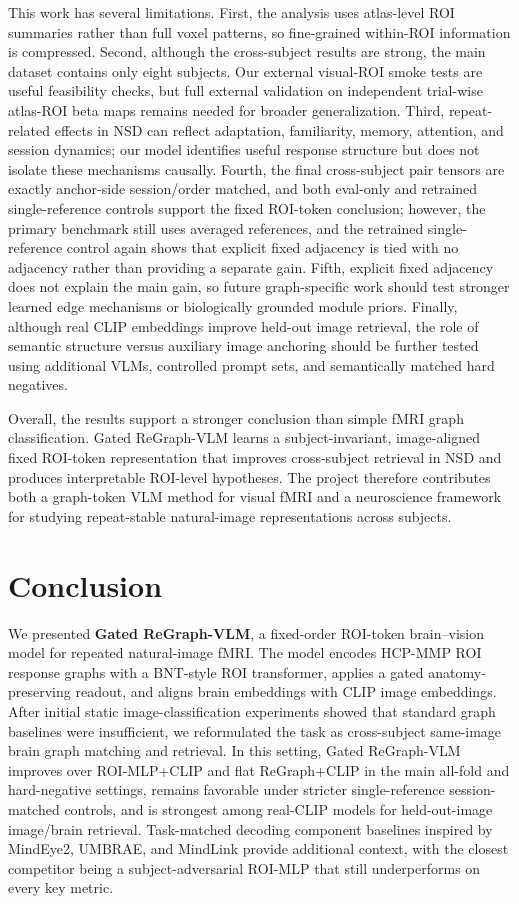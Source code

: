 \documentclass{article}
\begin{document}
This work has several limitations. First, the analysis uses atlas-level ROI summaries rather than full voxel patterns, so fine-grained within-ROI information is compressed. Second, although the cross-subject results are strong, the main dataset contains only eight subjects. Our external visual-ROI smoke tests are useful feasibility checks, but full external validation on independent trial-wise atlas-ROI beta maps remains needed for broader generalization. Third, repeat-related effects in NSD can reflect adaptation, familiarity, memory, attention, and session dynamics; our model identifies useful response structure but does not isolate these mechanisms causally. Fourth, the final cross-subject pair tensors are exactly anchor-side session/order matched, and both eval-only and retrained single-reference controls support the fixed ROI-token conclusion; however, the primary benchmark still uses averaged references, and the retrained single-reference control again shows that explicit fixed adjacency is tied with no adjacency rather than providing a separate gain. Fifth, explicit fixed adjacency does not explain the main gain, so future graph-specific work should test stronger learned edge mechanisms or biologically grounded module priors. Finally, although real CLIP embeddings improve held-out image retrieval, the role of semantic structure versus auxiliary image anchoring should be further tested using additional VLMs, controlled prompt sets, and semantically matched hard negatives.

Overall, the results support a stronger conclusion than simple fMRI graph classification. Gated ReGraph-VLM learns a subject-invariant, image-aligned fixed ROI-token representation that improves cross-subject retrieval in NSD and produces interpretable ROI-level hypotheses. The project therefore contributes both a graph-token VLM method for visual fMRI and a neuroscience framework for studying repeat-stable natural-image representations across subjects.

\section{Conclusion}
\label{sec:conclusion}

We presented \textbf{Gated ReGraph-VLM}, a fixed-order ROI-token brain--vision model for repeated natural-image fMRI. The model encodes HCP-MMP ROI response graphs with a BNT-style ROI transformer, applies a gated anatomy-preserving readout, and aligns brain embeddings with CLIP image embeddings. After initial static image-classification experiments showed that standard graph baselines were insufficient, we reformulated the task as cross-subject same-image brain graph matching and retrieval. In this setting, Gated ReGraph-VLM improves over ROI-MLP+CLIP and flat ReGraph+CLIP in the main all-fold and hard-negative settings, remains favorable under stricter single-reference session-matched controls, and is strongest among real-CLIP models for held-out-image image/brain retrieval. Task-matched decoding component baselines inspired by MindEye2, UMBRAE, and MindLink provide additional context, with the closest competitor being a subject-adversarial ROI-MLP that still underperforms on every key metric.
\end{document}
